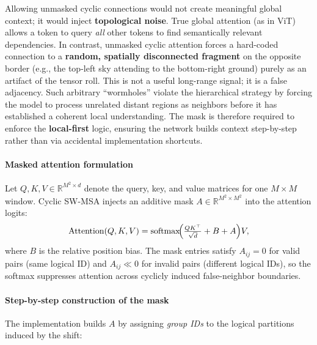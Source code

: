\noindent
Allowing unmasked cyclic connections would not create meaningful global context; it would inject \textbf{topological noise}. True global attention (as in ViT) allows a token to query \emph{all} other tokens to find semantically relevant dependencies. In contrast, unmasked cyclic attention forces a hard-coded connection to a \textbf{random, spatially disconnected fragment} on the opposite border (e.g., the top-left sky attending to the bottom-right ground) purely as an artifact of the tensor roll. This is not a useful long-range signal; it is a false adjacency. Such arbitrary ``wormholes'' violate the hierarchical strategy by forcing the model to process unrelated distant regions as neighbors before it has established a coherent local understanding. The mask is therefore required to enforce the \textbf{local-first} logic, ensuring the network builds context step-by-step rather than via accidental implementation shortcuts.

\paragraph{Masked attention formulation}
\noindent
Let \(Q,K,V \in \mathbb{R}^{M^2 \times d}\) denote the query, key, and value matrices for one
\(M \times M\) window.
Cyclic SW-MSA injects an additive mask \(A \in \mathbb{R}^{M^2 \times M^2}\) into the attention
logits:
\[
\text{Attention}(Q,K,V)
=
\text{softmax}\!\Bigl(\tfrac{QK^\top}{\sqrt{d}} + B + A\Bigr)V,
\]
where \(B\) is the relative position bias.
The mask entries satisfy \(A_{ij}=0\) for valid pairs (same logical ID)
and \(A_{ij}\ll 0\) for invalid pairs (different logical IDs),
so the softmax suppresses attention across cyclicly induced false-neighbor boundaries.

\paragraph{Step-by-step construction of the mask}
\noindent
The implementation builds \(A\) by assigning \emph{group IDs}
to the logical partitions induced by the shift:

